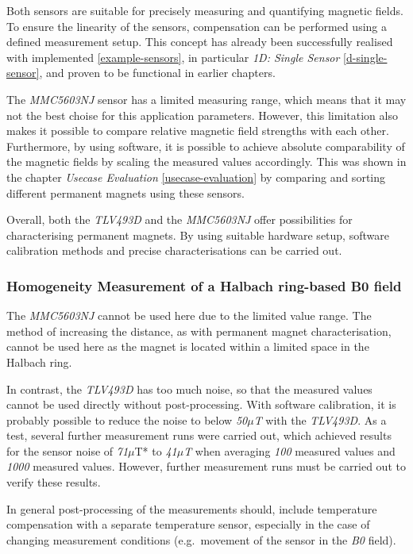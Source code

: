 Both sensors are suitable for precisely measuring and quantifying
magnetic fields. To ensure the linearity of the sensors, compensation
can be performed using a defined measurement setup. This concept has
already been successfully realised with implemented
\ref{example-sensors}, in particular \emph{1D: Single Sensor}
\ref{d-single-sensor}, and proven to be functional in earlier chapters.

The \emph{MMC5603NJ} sensor has a limited measuring range, which means
that it may not the best choise for this application parameters.
However, this limitation also makes it possible to compare relative
magnetic field strengths with each other. Furthermore, by using
software, it is possible to achieve absolute comparability of the
magnetic fields by scaling the measured values accordingly. This was
shown in the chapter \emph{Usecase Evaluation} \ref{usecase-evaluation}
by comparing and sorting different permanent magnets using these
sensors.

Overall, both the \emph{TLV493D} and the \emph{MMC5603NJ} offer
possibilities for characterising permanent magnets. By using suitable
hardware setup, software calibration methods and precise
characterisations can be carried out.

\hypertarget{homogeneity-measurement-of-a-halbach-ring-based-b0-field}{%
\subsubsection{Homogeneity Measurement of a Halbach ring-based B0
field}\label{homogeneity-measurement-of-a-halbach-ring-based-b0-field}}

The \emph{MMC5603NJ} cannot be used here due to the limited value range.
The method of increasing the distance, as with permanent magnet
characterisation, cannot be used here as the magnet is located within a
limited space in the Halbach ring.

In contrast, the \emph{TLV493D} has too much noise, so that the measured
values cannot be used directly without post-processing. With software
calibration, it is probably possible to reduce the noise to below
\emph{50\(\mu\)T} with the \emph{TLV493D}. As a test, several further
measurement runs were carried out, which achieved results for the sensor
noise of \emph{71}\(\mu\)T* to \emph{41\(\mu\)T} when averaging
\emph{100} measured values and \emph{1000} measured values. However,
further measurement runs must be carried out to verify these results.

In general post-processing of the measurements should, include
temperature compensation with a separate temperature sensor, especially
in the case of changing measurement conditions (e.g.~movement of the
sensor in the \emph{B0} field).

